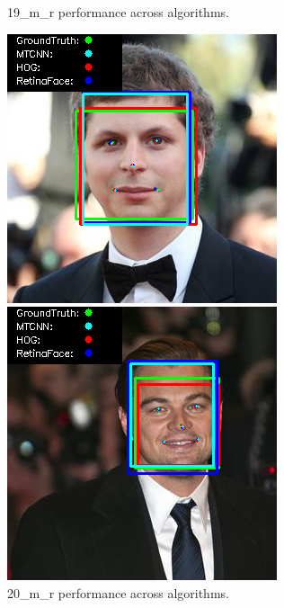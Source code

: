 \documentclass{l4proj}
\begin{document}
\begin{appendices}
\begin{figure}[h!]
\begin{minipage}{0.49\textwidth}
    \caption{19\_m\_r performance across algorithms.}
    \label{whoopi_result}
  \end{minipage}
\end{figure}

\begin{figure}[h!]
  \centering
  \begin{minipage}{0.49\textwidth}
    \centering
     \includegraphics[width=\textwidth]{images/appendix/20.png}
    \caption{20\_m\_r performance across algorithms.}
    \label{whoopi_result}
  \end{minipage}
    \hfill
    \begin{minipage}{0.49\textwidth}
    \centering
     \includegraphics[width=\textwidth]{images/appendix/21.png}

\end{minipage}
\end{figure}
\end{appendices}
\end{document}
